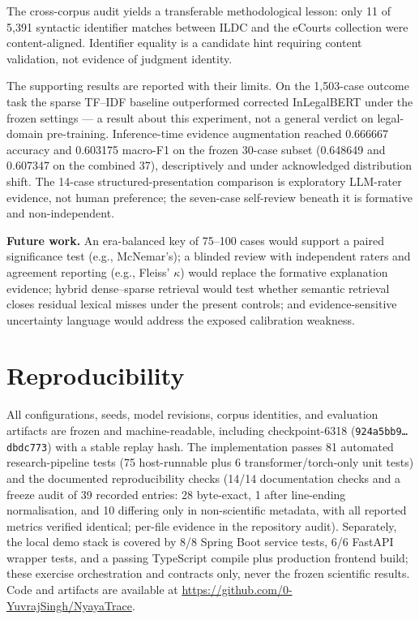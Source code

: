 \documentclass[conference]{IEEEtran}
\begin{document}
The cross-corpus audit yields a transferable methodological lesson: only 11 of
5{,}391 syntactic identifier matches between ILDC and the eCourts collection
were content-aligned. Identifier equality is a candidate hint requiring content
validation, not evidence of judgment identity.

The supporting results are reported with their limits. On the 1{,}503-case
outcome task the sparse TF--IDF baseline outperformed corrected InLegalBERT
under the frozen settings --- a result about this experiment, not a general
verdict on legal-domain pre-training. Inference-time evidence augmentation
reached 0.666667 accuracy and 0.603175 macro-F1 on the frozen 30-case subset
(0.648649 and 0.607347 on the combined 37), descriptively and under acknowledged
distribution shift. The 14-case structured-presentation comparison is
exploratory LLM-rater evidence, not human preference; the seven-case
self-review beneath it is formative and non-independent.

\textbf{Future work.} An era-balanced key of 75--100 cases would support a
paired significance test (e.g., McNemar's); a blinded review with
independent raters and agreement reporting (e.g., Fleiss'
$\kappa$) would replace the formative explanation evidence; hybrid
dense--sparse retrieval would test whether semantic retrieval closes
residual lexical misses under the present controls; and evidence-sensitive
uncertainty language would address the exposed
calibration weakness.

\section*{Reproducibility}

All configurations, seeds, model revisions, corpus identities, and evaluation
artifacts are frozen and machine-readable, including checkpoint-6318
(\texttt{924a5bb9\ldots dbdc773}) with a stable replay hash. The implementation passes 81 automated
research-pipeline tests (75 host-runnable plus 6
transformer/torch-only unit tests) and the documented
reproducibility checks (14/14 documentation checks and a freeze audit of 39 recorded
entries: 28 byte-exact, 1 after line-ending normalisation, and 10 differing only in
non-scientific metadata, with all reported metrics verified identical;
per-file evidence in the repository audit). Separately, the
  local demo stack is covered by 8/8 Spring Boot service tests, 6/6 FastAPI
  wrapper tests, and a passing TypeScript compile plus production frontend
build; these exercise orchestration and contracts only, never the frozen
scientific results. Code and artifacts are available
at \url{https://github.com/0-YuvrajSingh/NyayaTrace}.
\end{document}
